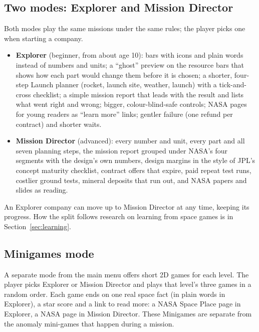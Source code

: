 \documentclass[11pt,a4paper]{article}
\begin{document}
\subsection{Two modes: Explorer and Mission Director}
Both modes play the same missions under the same rules; the player picks one when starting a company.
\begin{itemize}
  \item \textbf{Explorer} (beginner, from about age 10): bars with icons and plain words instead of numbers and
        units; a ``ghost'' preview on the resource bars that shows how each part would change them before it is
        chosen; a shorter, four-step Launch planner (rocket, launch site, weather, launch) with a tick-and-cross
        checklist; a simple mission report that leads with the result and lists what went right and wrong; bigger,
        colour-blind-safe controls; NASA pages for young readers as ``learn more'' links; gentler failure (one refund
        per contract) and shorter waits.
  \item \textbf{Mission Director} (advanced): every number and unit, every part and all seven planning steps, the
        mission report grouped under NASA's four segments with the design's own numbers, design margins in the style
        of JPL's concept maturity checklist, contract offers that expire, paid repeat test runs, costlier ground tests,
        mineral deposits that run out, and NASA papers and slides as reading.
\end{itemize}
An Explorer company can move up to Mission Director at any time, keeping its progress. How the split follows research
on learning from space games is in Section~\ref{sec:learning}.

\subsection{Minigames mode}
A separate mode from the main menu offers short 2D games for each level. The player picks Explorer or Mission
Director and plays that level's three games in a random order. Each game ends on one real space fact (in plain
words in Explorer), a star score and a link to read more: a NASA Space Place page in Explorer, a NASA page in Mission
Director. These Minigames are separate from the anomaly mini-games that happen during a mission.
\end{document}
